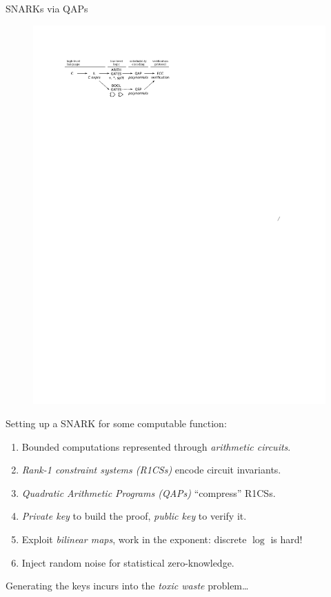 \documentclass[beamer={10pt,xcolor=dvipsnames},target=mst]{thud}
\begin{document}
\begin{frame}{SNARKs via QAPs~\cite{GennaroGPR2012,ParnoGHR2013,Groth2016}}
  \begin{figure}
    \centering
      \includegraphics{res/pinocchio.pdf}
  \end{figure}
  Setting up a SNARK for some computable function:
  \begin{enumerate}
    \item Bounded computations represented through \emph{arithmetic circuits}.
    \item \emph{Rank-1 constraint systems (R1CSs)} encode circuit invariants.
    \item \emph{Quadratic Arithmetic Programs (QAPs)} ``compress'' R1CSs.
    \item \emph{Private key} to build the proof, \emph{public key} to verify it.
    \item Exploit \emph{bilinear maps}, work in the exponent: discrete \(\log \) is hard!
    \item Inject random noise for statistical zero-knowledge.
  \end{enumerate}
  \vspace*{16pt}
  Generating the keys incurs into the \emph{toxic waste} problem\dots
\end{frame}
\end{document}
